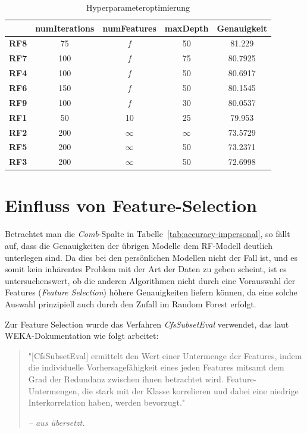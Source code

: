 \begin{table}
\centering
\begin{tabular}{|c|c|c|c||c|}
	\hline 
	& \textbf{numIterations} & \textbf{numFeatures} & \textbf{maxDepth} & \textbf{Genauigkeit} \\ 
	\hline 
	\textbf{RF8} & 75 & $f$ & 50 & 81.229 \\ 
	\hline 
	\textbf{RF7} & 100 & $f$ & 75 & 80.7925 \\ 
	\hline 
	\textbf{RF4} & 100 & $f$ & 50 & 80.6917 \\ 
	\hline 
	\textbf{RF6} & 150 & $f$ & 50 & 80.1545 \\ 
	\hline 
	\textbf{RF9} & 100 & $f$ & 30 & 80.0537 \\ 
	\hline 
	\textbf{RF1} & 50 & 10 & 25 & 79.953 \\ 
	\hline 
	\textbf{RF2} & 200 & $\infty$ & $\infty$ & 73.5729 \\ 
	\hline 
	\textbf{RF5} & 200 & $\infty$ & 50 & 73.2371 \\ 
	\hline 
	\textbf{RF3} & 200 & $\infty$ & 50 & 72.6998 \\ 
	\hline
\end{tabular}
\caption{Hyperparameteroptimierung}
\label{tab:hyperparam-opt}
\end{table}

\section{Einfluss von Feature-Selection}
Betrachtet man die \textit{Comb}-Spalte in Tabelle~\ref{tab:accuracy-impersonal}, so fällt auf, dass die Genauigkeiten der übrigen Modelle dem RF-Modell deutlich unterlegen sind. Da dies bei den persönlichen Modellen nicht der Fall ist, und es somit kein inhärentes Problem mit der Art der Daten zu geben scheint, ist es untersuchenswert, ob die anderen Algorithmen nicht durch eine Vorauswahl der Features (\textit{Feature Selection}) höhere Genauigkeiten liefern können, da eine solche Auswahl prinzipiell auch durch den Zufall im Random Forest erfolgt.

Zur Feature Selection wurde das Verfahren \textit{CfsSubsetEval} \cite{Hall1998} verwendet, das laut WEKA-Dokumentation wie folgt arbeitet:

\begin{quote}
	"[CfsSubsetEval] ermittelt den Wert einer Untermenge der Features, indem die individuelle Vorhersagefähigkeit eines jeden Features mitsamt dem Grad der Redundanz zwischen ihnen betrachtet wird. Feature-Untermengen, die stark mit der Klasse korrelieren und dabei eine niedrige Interkorrelation haben, werden bevorzugt."
	
	\textit{-- aus \cite{WekaCfsSubsetEval} übersetzt.}
\end{quote}

